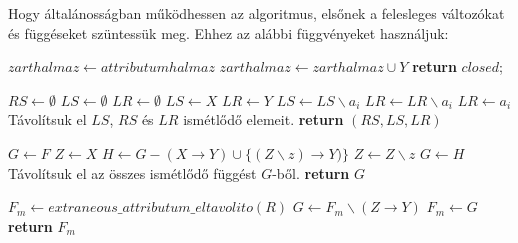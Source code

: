 Hogy általánosságban működhessen az algoritmus, elsőnek a felesleges változókat és függéseket szüntessük meg. Ehhez az alábbi függvényeket használjuk:
\hfill \break
\begin{algorithmic}
        \State $zarthalmaz \gets attributumhalmaz$
                \State $zarthalmaz \gets zarthalmaz \cup Y$
            \EndIf
        \EndWhile
        \State \textbf{return} $closed$;
    \EndFunction
    \hfill \break
    
    \State $RS \gets \emptyset$
    \State $LS \gets \emptyset$
    \State $LR \gets \emptyset$
        \State $LS \gets X$
        \State $LR \gets Y$
                \State $LS \gets LS \backslash a_i$
                \State $LR \gets LR \backslash a_i$
                \State $LR \gets a_i$
            \EndIf
        \EndFor
    \EndFor
    \State Távolítsuk el $LS$, $RS$ és $LR$ ismétlődő elemeit. 
    \State \textbf{return} $(RS,LS,LR)$
    \EndFunction
    \hfill \break
    
    \State $G \gets F$
            \State $Z \gets X$
                    \State $H \gets G - (X \rightarrow Y) \cup \{ (Z \backslash z) \rightarrow Y) \}$
                        \State $Z \gets Z \backslash z$
                    \EndIf
                \EndIf
            \EndFor
                \State $G \gets H$
            \EndIf
        \EndIf
    \EndFor
    \State Távolítsuk el az összes ismétlődő függést $G$-ből.
    \State \textbf{return} $G$
    \EndFunction
    \hfill \break
    
    \State $F_m \gets extraneous\_attributum\_eltavolito(R)$
            \State $G \gets F_m \backslash (Z \rightarrow Y)$
                \State $F_m \gets G$
            \EndIf
        \EndWhile
    \EndFor
    \State \textbf{return} $F_m$
    \EndFunction
    \hfill \break
    

\end{algorithmic}
